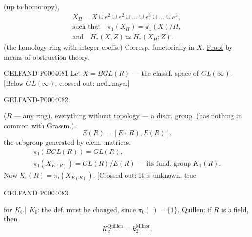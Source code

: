 (up to homotopy),
\begingroup\color{black}\begin{gather*}
X_H=X\cup e^2\cup e^2\cup\dots\cup e^3\cup\dots\cup e^3,\\
\text{such that}\quad\pi_1(X_H)=\pi_1(X)/H,\\
\text{and}\quad H_*(X, Z)\simeq H_*(X_H; Z).
\end{gather*}\endgroup
(the homology ring with integer coeffs.)
Corresp. functorially in $X$.
\underline{Proof} by means of obstruction theory.


\begin{GelfandAdjacentEvidence}{GELFAND-P000408}{1}
Let $X=BGL (R)$ — the classif. space of $GL (\infty)$.
[Below $GL (\infty)$, crossed out: ned…naya.]
\end{GelfandAdjacentEvidence}
\begin{GelfandAdjacentEvidence}{GELFAND-P000408}{2}


\underline{($R$ — any ring)}.
everything without topology — a \underline{\underline{discr. group}}.
(has nothing in common with Grassm.).
\begingroup\color{black}\begin{equation*}
E (R)=[E (R), E (R)].
\end{equation*}\endgroup
the subgroup generated by elem. matrices.
\begingroup\color{black}\begin{gather*}
\pi_1(BGL (R))=GL (R),\\
\pi_1(X_{E (R)})=GL (R)/E (R)\text{ — its fund. group }K_1(R).
\end{gather*}\endgroup
Now $K_i (R)=\pi_i (X_{E (R)})$.
[Crossed out: It is unknown, true
\end{GelfandAdjacentEvidence}
\begin{GelfandAdjacentEvidence}{GELFAND-P000408}{3}


for $K_0$.]
$K_0$: the def. must be changed, since $\pi_0(\ )=\{1\}$.
\underline{Quillen}: if $R$ is a field, then
\begingroup\color{black}\begin{equation*}
K_2^{\mathrm{Quillen}}=k_2^{\mathrm{Milnor}}.
\end{equation*}\endgroup
{}
\end{GelfandAdjacentEvidence}
